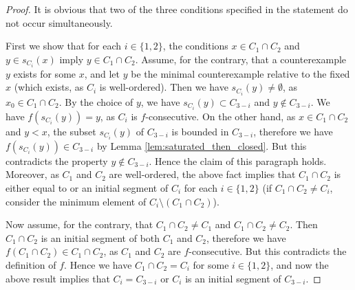 \documentclass{article}
\begin{document}
\begin{proof}
It is obvious that two of the three conditions specified in the statement do not occur simultaneously.

First we show that for each $i \in \{1,2\}$, the conditions $x \in C_1 \cap C_2$ and $y \in s_{C_i}(x)$ imply $y \in C_1 \cap C_2$.
Assume, for the contrary, that a counterexample $y$ exists for some $x$, and let $y$ be the minimal counterexample relative to the fixed $x$ (which exists, as $C_i$ is well-ordered).
Then we have $s_{C_i}(y) \neq \emptyset$, as $x_0 \in C_1 \cap C_2$.
By the choice of $y$, we have $s_{C_i}(y) \subset C_{3-i}$ and $y \not\in C_{3-i}$.
We have $f(s_{C_i}(y)) = y$, as $C_i$ is $f$-consecutive.
On the other hand, as $x \in C_1 \cap C_2$ and $y < x$, the subset $s_{C_i}(y)$ of $C_{3-i}$ is bounded in $C_{3-i}$, therefore we have $f(s_{C_i}(y)) \in C_{3-i}$ by Lemma \ref{lem:saturated_then_closed}.
But this contradicts the property $y \not\in C_{3-i}$.
Hence the claim of this paragraph holds.
Moreover, as $C_1$ and $C_2$ are well-ordered, the above fact implies that $C_1 \cap C_2$ is either equal to or an initial segment of $C_i$ for each $i \in \{1,2\}$ (if $C_1 \cap C_2 \neq C_i$, consider the minimum element of $C_i \setminus (C_1 \cap C_2)$).

Now assume, for the contrary, that $C_1 \cap C_2 \neq C_1$ and $C_1 \cap C_2 \neq C_2$.
Then $C_1 \cap C_2$ is an initial segment of both $C_1$ and $C_2$, therefore we have $f(C_1 \cap C_2) \in C_1 \cap C_2$, as $C_1$ and $C_2$ are $f$-consecutive.
But this contradicts the definition of $f$.
Hence we have $C_1 \cap C_2 = C_i$ for some $i \in \{1,2\}$, and now the above result implies that $C_i = C_{3-i}$ or $C_i$ is an initial segment of $C_{3-i}$.
\end{proof}
\end{document}
